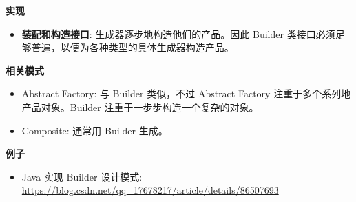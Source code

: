 \noindent\textbf{实现}
\begin{itemize}
    \item \textbf{装配和构造接口}: 生成器逐步地构造他们的产品。因此 Builder 类接口必须足够普遍，以便为各种类型的具体生成器构造产品。
\end{itemize}

\noindent\textbf{相关模式}
\begin{itemize}
    \item Abstract Factory: 与 Builder 类似，不过 Abstract Factory 注重于多个系列地产品对象。Builder 注重于一步步构造一个复杂的对象。
    \item Composite: 通常用 Builder 生成。
\end{itemize}

\noindent\textbf{例子}
\begin{itemize}
    \item Java 实现 Builder 设计模式: \url{https://blog.csdn.net/qq_17678217/article/details/86507693} 
\end{itemize}



\newpage